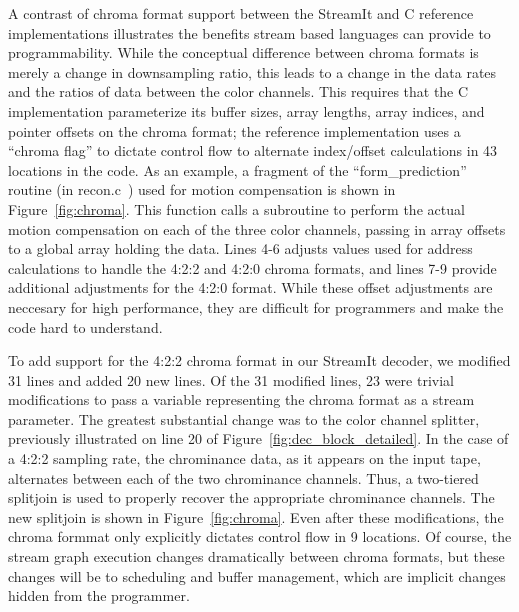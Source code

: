 \label{section:chroma}

A contrast of chroma format support between the StreamIt and  C
reference implementations illustrates the benefits stream based
languages can  provide to programmability. While the conceptual
difference between chroma formats is merely a change in
downsampling ratio, this leads to a change in the data rates and the
ratios of data between the color channels. This requires that the C
implementation parameterize its buffer sizes, array lengths, array
indices, and pointer offsets on the chroma format; the reference
implementation uses a  ``chroma flag'' to dictate control flow to
alternate index/offset calculations  in 43 locations in the code. As
an example, a fragment of the ``form\_prediction'' routine  (in
recon.c~\cite{reference-mpeg-c}) used for motion compensation is shown
in  Figure~\ref{fig:chroma}. This function calls a  subroutine to
perform the actual motion compensation on each of the three color
channels, passing in array offsets to a global array holding the
data. Lines 4-6 adjusts values used for address calculations to handle
the 4:2:2 and 4:2:0 chroma formats, and lines 7-9 provide
additional adjustments for the 4:2:0 format. While these offset
adjustments are neccesary for high performance, they are difficult for
programmers  and make the code hard to understand.

To add support for the 4:2:2 chroma format in our StreamIt decoder, we
modified 31 lines and added 20 new lines. Of the 31 modified lines, 23
were trivial modifications to pass a variable representing the
chroma format as a stream parameter. The greatest substantial
change was to the color channel splitter, previously illustrated on line 20 of 
Figure~\ref{fig:dec_block_detailed}. In the case of a 4:2:2 sampling rate,
the chrominance data, as it appears on the input tape, alternates
between each of the two chrominance channels. Thus, a two-tiered
splitjoin is used to properly recover the appropriate chrominance
channels. The new splitjoin is shown in Figure~\ref{fig:chroma}. 
Even after these modifications, the chroma formmat only explicitly dictates
control flow in 9 locations. Of course, the stream graph execution changes 
dramatically between chroma formats, but these changes will be to 
scheduling and buffer management, which are implicit changes hidden from 
the programmer. 

